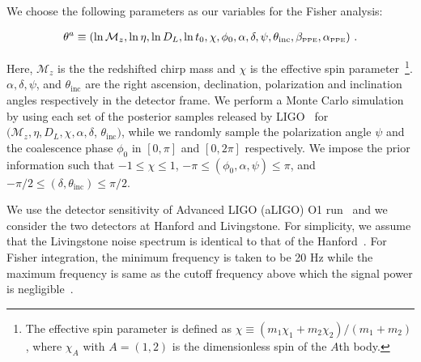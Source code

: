 \documentclass[prd,twocolumn,nofootinbib]{revtex4-1}
\newcommand\ba{\begin{eqnarray}}
\newcommand\ea{\end{eqnarray}}
\newcommand\bw{\begin{widetext}}
\newcommand\ew{\end{widetext}}
\newcommand{\lb}{\left(}
\newcommand{\rb}{\right)}
\newcommand{\PPE}{{\mbox{\tiny PPE}}}
\begin{document}
We choose the following parameters as our variables for the Fisher analysis:
\bw
\ba\label{parameters}
\theta^a\equiv \lb \ln{\mathcal{M}_z}, \ln{\eta}, \ln{D_L}, \ln{t_0}, \chi, \phi_0, \alpha, \delta, \psi, \theta_{\text{inc}}, \beta_{\PPE}, \alpha_{\PPE} \rb\,.
\ea
\ew
Here, $\mathcal{M}_z$ is the the redshifted chirp mass and $\chi$ is the effective spin parameter~\footnote{The effective spin parameter is defined as $\chi\equiv\lb m_1 \chi_1+m_2\chi_2\rb /\lb m_1+m_2\rb$, where $\chi_A$ with $A=(1,2)$ is the dimensionless spin of the $A$th body.}. $\alpha, \delta, \psi$, and  $\theta_{\text{inc}}$ are the right ascension, declination, polarization and inclination angles respectively in the detector frame.
We perform a Monte Carlo simulation by using each set of the posterior samples released by LIGO~\cite{ligo:sample} for $(\mathcal{M}_z, \eta, D_L, \chi, \alpha, \delta$, $\theta_{\text{inc}})$, while we randomly sample the polarization angle $\psi$ and the coalescence phase $\phi_0$ in $[0,\pi]$ and $[0,2\pi]$ respectively.
We impose the prior information such that $-1 \leq \chi \leq 1$, $-\pi \leq (\phi_0, \alpha, \psi) \leq \pi$, and $-\pi/2 \leq ( \delta, \theta_{\text{inc}}) \leq \pi/2$.

We use the detector sensitivity of Advanced LIGO (aLIGO) O1 run~\cite{LIGOScientific:2018mvr} and we consider the two detectors at Hanford and Livingstone. For simplicity, we assume that the Livingstone noise spectrum is identical to that of the Hanford~\cite{Yunes:2009yz}. For Fisher integration, the minimum frequency is taken to be 20 Hz while the maximum frequency is same as the cutoff frequency above which the signal power is negligible~\cite{Ajith:2009bn}.
\end{document}
